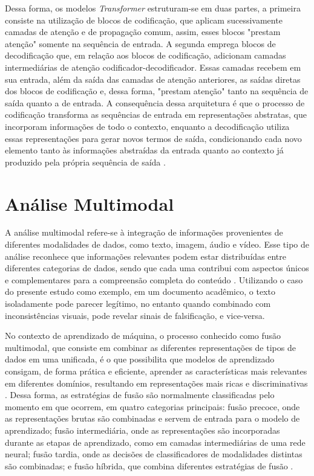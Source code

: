 Dessa forma, os modelos \textit{Transformer} estruturam-se em duas partes, a primeira consiste na utilização de blocos de codificação, que aplicam sucessivamente camadas de atenção e de propagação comum, assim, esses blocos "prestam atenção" somente na sequência de entrada. A segunda emprega blocos de decodificação que, em relação aos blocos de codificação, adicionam camadas intermediárias de atenção codificador-decodificador. Essas camadas recebem em sua entrada, além da saída das camadas de atenção anteriores, as saídas diretas dos blocos de codificação e, dessa forma, "prestam atenção" tanto na sequência de saída quanto a de entrada. A consequência dessa arquitetura é que o processo de codificação transforma as sequências de entrada em representações abstratas, que incorporam informações de todo o contexto, enquanto a decodificação utiliza essas representações para gerar novos termos de saída, condicionando cada novo elemento tanto às informações abstraídas da entrada quanto ao contexto já produzido pela própria sequência de saída \cite{transformer}.

\section{Análise Multimodal}

A análise multimodal refere-se à integração de informações provenientes de diferentes modalidades de dados, como texto, imagem, áudio e vídeo. Esse tipo de análise reconhece que informações relevantes podem estar distribuídas entre diferentes categorias de dados, sendo que cada uma contribui com aspectos únicos e complementares para a compreensão completa do conteúdo \cite{multimodalsurvey}. Utilizando o caso do presente estudo como exemplo, em um documento acadêmico, o texto isoladamente pode parecer legítimo, no entanto quando combinado com inconsistências visuais, pode revelar sinais de falsificação, e vice-versa.

No contexto de aprendizado de máquina, o processo conhecido como fusão multimodal, que consiste em combinar as diferentes representações de tipos de dados em uma unificada, é o que possibilita que modelos de aprendizado consigam, de forma prática e eficiente, aprender as características mais relevantes em diferentes domínios, resultando em representações mais ricas e discriminativas \cite{multimodalsurvey,multimodalforgery}. Dessa forma, as estratégias de fusão são normalmente classificadas pelo momento em que ocorrem, em quatro categorias principais: fusão precoce, onde as representações brutas são combinadas e servem de entrada para o modelo de aprendizado; fusão intermediária, onde as representações são incorporadas durante as etapas de aprendizado, como em camadas intermediárias de uma rede neural; fusão tardia, onde as decisões de classificadores de modalidades distintas são combinadas; e fusão híbrida, que combina diferentes estratégias de fusão \cite{multimodalsurvey}.

